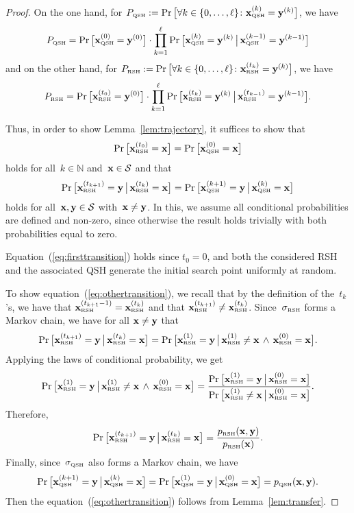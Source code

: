 \documentclass[a4paper,11pt]{article}
\begin{document}
\begin{proof}
On the one hand, for $P_\QSH:=\Pr\big[\forall k\in\{0,\dots,\ell\}\colon\xvec[k]_\QSH=\yvec[k]\big]$, we have
\[
P_\QSH =\Pr\big[\xvec[0]_\QSH=\yvec[0]\big]\cdot\prod_{k=1}^\ell\Pr\big[\xvec[k]_\QSH=\yvec[k]\bmid\xvec[k-1]_\QSH=\yvec[k-1]\big]
\]
and on the other hand, for $P_\RSH:=\Pr\big[\forall k\in\{0,\dots,\ell\}\colon\xvec[t_k]_\RSH=\yvec[k]\big]$, we have
\[
P_\RSH=\Pr\big[\xvec[t_0]_\RSH=\yvec[0]\big]\cdot\prod_{k=1}^\ell\Pr\big[\xvec[t_k]_\RSH=\yvec[k]\bmid\xvec[t_{k-1}]_\RSH=\yvec[k-1]\big].
\]

Thus, in order to show Lemma~\ref{lem:trajectory}, it suffices to show that
\begin{equation}
\label{eq:firsttransition}
\Pr\big[\xvec[t_0]_\RSH=\xvec\big]=\Pr\big[\xvec[0]_\QSH=\xvec\big]
\end{equation}
holds for all~$k\in\mathbb{N}$ and~$\xvec\in\mathcal{S}$ and that
\begin{equation}
\label{eq:othertransition}
\Pr\big[\xvec[t_{k+1}]_\RSH=\yvec\bmid\xvec[t_k]_\RSH=\xvec\big]=\Pr\big[\xvec[k+1]_\QSH=\yvec\bmid\xvec[k]_\QSH=\xvec\big]
\end{equation}
holds for all~$\xvec,\yvec\in\mathcal{S}$ with~$\xvec\neq\yvec$. In this, we assume all conditional probabilities are defined and non-zero, since otherwise the result holds trivially with both probabilities equal to zero.

Equation~(\ref{eq:firsttransition}) holds since $t_0=0$, and both the considered RSH and the associated QSH generate the initial search point uniformly at random.

To show equation~(\ref{eq:othertransition}), we recall that by the definition of the~$t_k$'s, we have that $\xvec[t_{k+1}-1]_\RSH=\xvec[t_k]_\RSH$ and that $\xvec[t_{k+1}]_\RSH\neq\xvec[t_k]_\RSH$. Since~$\sigma_{\text{\tiny\rm RSH}}$ forms a Markov chain, we have for all $\xvec \neq \yvec$ that
\[
\Pr\big[\xvec[t_{k+1}]_\RSH=\yvec\bmid\xvec[t_k]_\RSH=\xvec\big]=\Pr\big[\xvec[1]_\RSH=\yvec\bmid\xvec[1]_\RSH\neq\xvec\,\wedge\,\xvec[0]_\RSH=\xvec\big].
\]
Applying the laws of conditional probability, we get 
\[
\Pr\big[\xvec[1]_\RSH=\yvec\bmid\xvec[1]_\RSH\neq\xvec\,\wedge\,\xvec[0]_\RSH=\xvec\big]=\frac{\Pr\big[\xvec[1]_\RSH=\yvec\bmid\xvec[0]_\RSH=\xvec\big]}{\Pr\big[\xvec[1]_\RSH\neq\xvec\bmid\xvec[0]_\RSH=\xvec\big]}.
\]
Therefore,
\[
\Pr\big[\xvec[t_{k+1}]_\RSH=\yvec\bmid\xvec[t_k]_\RSH=\xvec\big]=\frac{p_\RSH(\xvec,\yvec)}{p_\RSH(\xvec)}.
\]
Finally, since~$\sigma_{\text{\tiny\rm QSH}}$ also forms a Markov chain, we have
\[
\Pr\big[\xvec[k+1]_\QSH=\yvec\bmid\xvec[k]_\QSH=\xvec\big]=\Pr\big[\xvec[1]_\QSH=\yvec\bmid\xvec[0]_\QSH=\xvec\big]=p_\QSH(\xvec,\yvec).
\]
Then the equation~(\ref{eq:othertransition}) follows from Lemma~\ref{lem:transfer}.
\end{proof}
\end{document}
